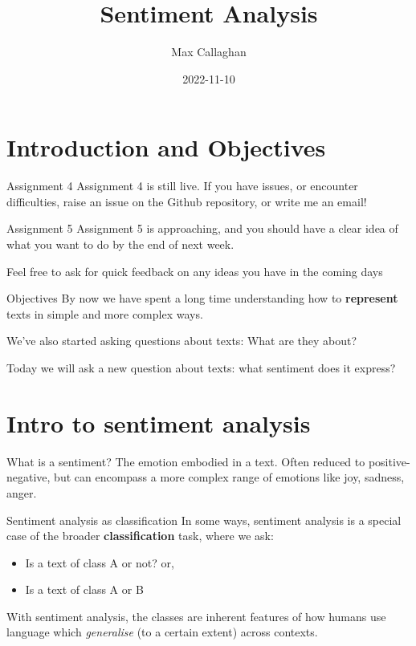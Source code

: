 \documentclass[
  10pt,
  ignorenonframetext,
  aspectratio=169]{beamer}
\title{Sentiment Analysis}
\author{Max Callaghan}
\date{2022-11-10}
\providecommand{\tightlist}{%
  \setlength{\itemsep}{0pt}\setlength{\parskip}{0pt}}
\begin{document}
\frame{\titlepage}

\hypertarget{introduction-and-objectives}{%
\section{Introduction and
Objectives}\label{introduction-and-objectives}}

\begin{frame}{Assignment 4}
\protect\hypertarget{assignment-4}{}
Assignment 4 is still live. If you have issues, or encounter
difficulties, raise an issue on the Github repository, or write me an
email!
\end{frame}

\begin{frame}{Assignment 5}
\protect\hypertarget{assignment-5}{}
Assignment 5 is approaching, and you should have a clear idea of what
you want to do by the end of next week.

Feel free to ask for quick feedback on any ideas you have in the coming
days
\end{frame}

\begin{frame}{Objectives}
\protect\hypertarget{objectives}{}
By now we have spent a long time understanding how to \textbf{represent}
texts in simple and more complex ways.

We've also started asking questions about texts: What are they about?

Today we will ask a new question about texts: what sentiment does it
express?
\end{frame}

\hypertarget{intro-to-sentiment-analysis}{%
\section{Intro to sentiment
analysis}\label{intro-to-sentiment-analysis}}

\begin{frame}{What is a sentiment?}
\protect\hypertarget{what-is-a-sentiment}{}
The emotion embodied in a text. Often reduced to positive-negative, but
can encompass a more complex range of emotions like joy, sadness, anger.
\end{frame}

\begin{frame}{Sentiment analysis as classification}
\protect\hypertarget{sentiment-analysis-as-classification}{}
In some ways, sentiment analysis is a special case of the broader
\textbf{classification} task, where we ask:

\begin{itemize}
\tightlist
\item
  Is a text of class A or not? or,
\item
  Is a text of class A or B
\end{itemize}

With sentiment analysis, the classes are inherent features of how humans
use language which \emph{generalise} (to a certain extent) across
contexts.
\end{frame}
\end{document}
